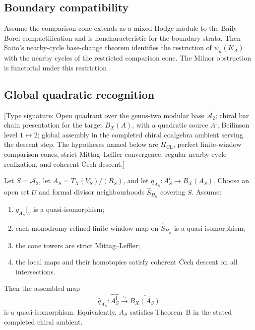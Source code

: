 \subsection{Boundary compatibility}
\label{subsec:tbsp-baily-borel-boundary}

\begin{proposition}
\label{prop:tbsp-baily-borel-compatibility}
Assume the comparison cone extends as a mixed Hodge module to the
Baily--Borel compactification and is noncharacteristic for the
boundary strata.  Then Saito's nearby-cycle base-change theorem
identifies the restriction of \(\psi_n(K_A)\) with the nearby cycles
of the restricted comparison cone.  The Milnor obstruction is
functorial under this restriction \cite{Saito1988}.
\end{proposition}

\subsection{Global quadratic recognition}
\label{subsec:tbsp-global-inversion-theorem}

\begin{theorem}
\label{thm:tbsp-global-inversion-all-admissible}
\textup{[Type signature: Open quadrant over the genus-two modular
base \(\overline{\mathcal A_2}\); chiral bar chain presentation for
the target \(B_X(A)\), with a quadratic source \(A^{\mathrm i}\);
Beilinson level \(1\leftrightarrow2\); global assembly in the
completed chiral coalgebra ambient serving the descent step.  The hypotheses
named below are \(H_{\mathrm{CL}}\), perfect finite-window comparison
cones, strict Mittag--Leffler convergence, regular nearby-cycle
realization, and coherent \v Cech descent.]}

Let \(S=\overline{\mathcal A_2}\), let
\(A_S=T_X(V_S)/(R_S)\), and let
\(q_{A_S}\colon A_S^{\mathrm i}\to B_X(A_S)\).  Choose an open set
\(U\) and formal divisor neighbourhoods
\(\widehat S_{H_n}\) covering \(S\).  Assume:
\begin{enumerate}[label=\textup{(G\arabic*)}]
\item \(q_{A_S}|_U\) is a quasi-isomorphism;
\item each monodromy-refined finite-window map on
 \(\widehat S_{H_n}\) is a quasi-isomorphism;
\item the cone towers are strict Mittag--Leffler;
\item the local maps and their homotopies satisfy coherent \v Cech
 descent on all intersections.
\end{enumerate}
Then the assembled map
\[
 \widehat q_{A_S}\colon
 \widehat{A_S^{\mathrm i}}
 \xrightarrow{\sim}
 \widehat{B_X(A_S)}
\]
is a quasi-isomorphism.  Equivalently, \(A_S\) satisfies Theorem~B in
the stated completed chiral ambient.
\end{theorem}

